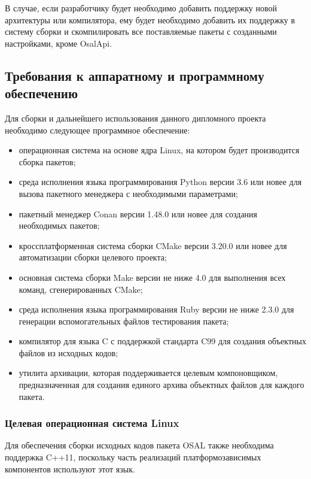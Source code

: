 
В случае, если разработчику будет необходимо добавить поддержку новой архитектуры
или компилятора, ему будет необходимо добавить их поддержку в систему сборки
и скомпилировать все поставляемые пакеты с созданными настройками, кроме OsalApi.

\subsection{Требования к аппаратному и программному обеспечению}

Для сборки и дальнейшего использования данного дипломного проекта необходимо
следующее программное обеспечение:
\begin{itemize}
    \item операционная система на основе ядра Linux, на котором будет производится сборка пакетов;
    \item среда исполнения языка программирования Python версии 3.6 или новее для вызова пакетного менеджера с необходимыми параметрами;
    \item пакетный менеджер Conan версии 1.48.0 или новее для создания необходимых пакетов;
    \item кроссплатформенная система сборки CMake версии 3.20.0 или новее
    для автоматизации сборки целевого проекта;
    \item основная система сборки Make версии не ниже 4.0 для выполнения всех команд,
    сгенерированных CMake;
    \item среда исполнения языка программирования Ruby версии не ниже 2.3.0
    для генерации вспомогательных файлов тестирования пакета;
    \item компилятор для языка C с поддержкой стандарта C99 для создания объектных
    файлов из исходных кодов;
    \item утилита архивации, которая поддерживается целевым компоновщиком,
    предназначенная для создания единого архива объектных файлов для каждого пакета.
\end{itemize}

\subsubsection{Целевая операционная система Linux}

Для обеспечения сборки исходных кодов пакета OSAL также необходима поддержка
C++11, поскольку часть реализаций платформозависимых компонентов используют
этот язык.

